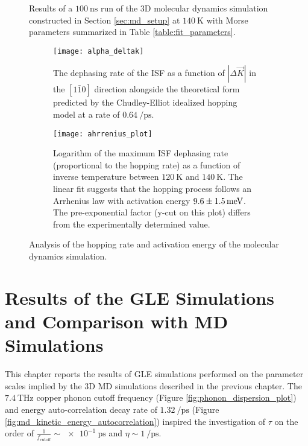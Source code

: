 \begin{figure}
	\caption{Results of a $\SI{100}{\nano\second}$ run of the 3D molecular dynamics simulation constructed in Section \ref{sec:md_setup} at $\SI{140}{\kelvin}$ with Morse parameters summarized in Table \ref{table:fit_parameters}.}
	\label{fig:md_results}
\end{figure}


\begin{figure}
	\begin{subfigure}{0.49\textwidth}
		\texttt{[image: alpha\_deltak]}
		\caption{The dephasing rate of the ISF as a function of $\left|\Delta{\vec{K}}\right|$ in the $\left[1\bar{1}0\right]$ direction alongside the theoretical form predicted by the Chudley-Elliot idealized hopping model \cite{Chudley_1961} at a rate of $\SI{0.64}{\per\pico\second}$.}
		\label{fig:alpha_deltak}
	\end{subfigure}
	\hfill	
	\begin{subfigure}{0.49\textwidth}
		\texttt{[image: ahrrenius\_plot]}
		\caption{Logarithm of the maximum ISF dephasing rate (proportional to the hopping rate) as a function of inverse temperature between $\SI{120}{\kelvin}$ and $\SI{140}{\kelvin}$. The linear fit suggests that the hopping process follows an Arrhenius law with activation energy $9.6\pm \SI{1.5}{\mev}$. The pre-exponential factor (y-cut on this plot) differs from the experimentally determined value.}
		\label{fig:ahrrenius_plot}
	\end{subfigure}

	\caption{Analysis of the hopping rate and activation energy of the molecular dynamics simulation.}	
\end{figure}

\chapter{Results of the GLE Simulations and Comparison with MD Simulations}

This chapter reports the results of GLE simulations performed on the parameter scales implied by the 3D MD simulations described in the previous chapter. The $\SI{7.4}{\tera\hertz}$ copper phonon cutoff frequency (Figure \ref{fig:phonon_dispersion_plot}) and energy auto-correlation decay rate of $\SI{1.32}{\per\pico\second}$ (Figure \ref{fig:md_kinetic_energy_autocorrelation}) inspired the investigation of $\tau$ on the order of $\frac{1}{f_{\text{cutoff}}} \sim \SI{e-1}{\pico\second}$ and $\eta \sim \SI{1}{\per\pico\second}$.

